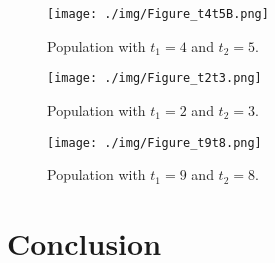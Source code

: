 \documentclass[runningheads]{llncs}
\begin{document}
\begin{figure}
\texttt{[image: ./img/Figure\_t4t5B.png]}
\caption{Population with $t_1 = 4$ and $t_2 = 5$.} \label{figt4t5B}
\end{figure}

\begin{figure}
\texttt{[image: ./img/Figure\_t2t3.png]}
\caption{Population with $t_1 = 2$ and $t_2 = 3$.} \label{figt2t3}
\end{figure}

\begin{figure}
\texttt{[image: ./img/Figure\_t9t8.png]}
\caption{Population with $t_1 = 9$ and $t_2 = 8$.} \label{figt9t8}
\end{figure}

\section{Conclusion}
\end{document}
